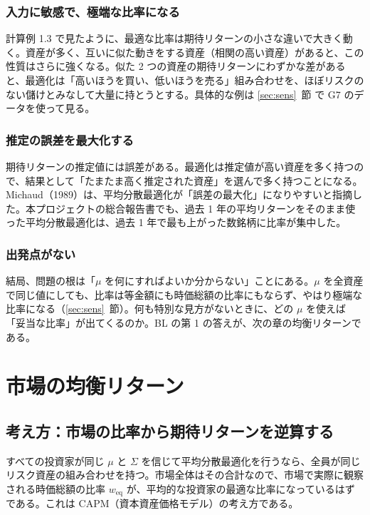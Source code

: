 \documentclass[xelatex,ja=standard,jafont=hiragino-pron,a4paper,11pt,openany]{bxjsreport}
\newcommand{\weq}{w_{\mathrm{eq}}}
\newcommand{\secref}[1]{\ref{#1}~節}
\begin{document}
\subsection{入力に敏感で、極端な比率になる}

計算例 1.3 で見たように、最適な比率は期待リターンの小さな違いで大きく動く。資産が多く、互いに似た動きをする資産（相関の高い資産）があると、この性質はさらに強くなる。似た 2 つの資産の期待リターンにわずかな差があると、最適化は「高いほうを買い、低いほうを売る」組み合わせを、ほぼリスクのない儲けとみなして大量に持とうとする。具体的な例は \secref{sec:sens} で G7 のデータを使って見る。

\subsection{推定の誤差を最大化する}

期待リターンの推定値には誤差がある。最適化は推定値が高い資産を多く持つので、結果として「たまたま高く推定された資産」を選んで多く持つことになる。Michaud（1989）は、平均分散最適化が「誤差の最大化」になりやすいと指摘した。本プロジェクトの総合報告書でも、過去 1 年の平均リターンをそのまま使った平均分散最適化は、過去 1 年で最も上がった数銘柄に比率が集中した。

\subsection{出発点がない}

結局、問題の根は「$\mu$ を何にすればよいか分からない」ことにある。$\mu$ を全資産で同じ値にしても、比率は等金額にも時価総額の比率にもならず、やはり極端な比率になる（\secref{sec:sens}）。何も特別な見方がないときに、どの $\mu$ を使えば「妥当な比率」が出てくるのか。BL の第 1 の答えが、次の章の均衡リターンである。

\chapter{市場の均衡リターン}\label{ch:eq}

\section{考え方：市場の比率から期待リターンを逆算する}

すべての投資家が同じ $\mu$ と $\Sigma$ を信じて平均分散最適化を行うなら、全員が同じリスク資産の組み合わせを持つ。市場全体はその合計なので、市場で実際に観察される時価総額の比率 $\weq$ が、平均的な投資家の最適な比率になっているはずである。これは CAPM（資本資産価格モデル）の考え方である。
\end{document}

